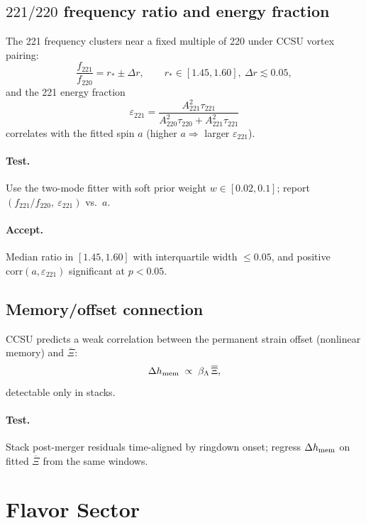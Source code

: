 \subsection{\texorpdfstring{$221/220$}{221/220} frequency ratio and energy fraction}
The 221 frequency clusters near a fixed multiple of 220 under CCSU vortex pairing:
\begin{equation}
\frac{f_{221}}{f_{220}} = r_{*} \pm \Delta r,\qquad r_{*}\in[1.45,1.60],\ \Delta r\lesssim 0.05,
\end{equation}
and the 221 energy fraction
\begin{equation}
\varepsilon_{221}=\frac{A_{221}^2\tau_{221}}{A_{220}^2\tau_{220}+A_{221}^2\tau_{221}}
\end{equation}
correlates with the fitted spin \(a\) (higher \(a\Rightarrow\) larger \(\varepsilon_{221}\)).
\paragraph{Test.} Use the two-mode fitter with soft prior weight \(w\in[0.02,0.1]\); report \((f_{221}/f_{220},\ \varepsilon_{221})\) vs.\ \(a\).
\paragraph{Accept.} Median ratio in \([1.45,1.60]\) with interquartile width \(\le 0.05\), and positive \(\mathrm{corr}(a,\varepsilon_{221})\) significant at \(p<0.05\).

\subsection{Memory/offset connection}
CCSU predicts a weak correlation between the permanent strain offset (nonlinear memory) and \(\overline{\Xi}\):
\begin{equation}
\Delta h_{\rm mem}\;\propto\; \beta_\Lambda\,\overline{\Xi},
\end{equation}
detectable only in stacks.
\paragraph{Test.} Stack post-merger residuals time-aligned by ringdown onset; regress \(\Delta h_{\rm mem}\) on fitted \(\overline{\Xi}\) from the same windows.

\section{Flavor Sector}

